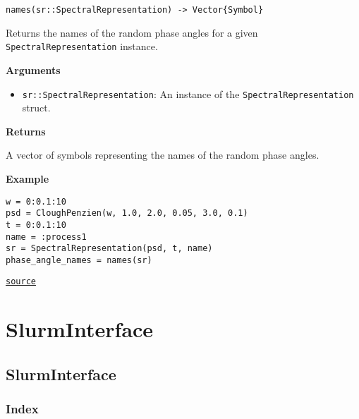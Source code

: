 \begin{adjustwidth}{2em}{0pt}


\begin{verbatim}
names(sr::SpectralRepresentation) -> Vector{Symbol}
\end{verbatim}

Returns the names of the random phase angles for a given \texttt{SpectralRepresentation} instance.

\textbf{Arguments}

\begin{itemize}
\item \texttt{sr::SpectralRepresentation}: An instance of the \texttt{SpectralRepresentation} struct.

\end{itemize}
\textbf{Returns}

A vector of symbols representing the names of the random phase angles.

\textbf{Example}


\begin{verbatim}
w = 0:0.1:10
psd = CloughPenzien(w, 1.0, 2.0, 0.05, 3.0, 0.1)
t = 0:0.1:10
name = :process1
sr = SpectralRepresentation(psd, t, name)
phase_angle_names = names(sr)
\end{verbatim}



\href{https://github.com/friesischscott/UncertaintyQuantification.jl/blob/f5ee6cce729f0d6a57979257379c942cdf42f86f/src/inputs/stochasticprocesses/spectralrepresentation.jl#L220-L241}{\texttt{source}}


\end{adjustwidth}

\chapter{SlurmInterface}


\section{SlurmInterface}



\label{260344389708059720}{}


\subsection{Index}



\label{6663683553518785561}{}


